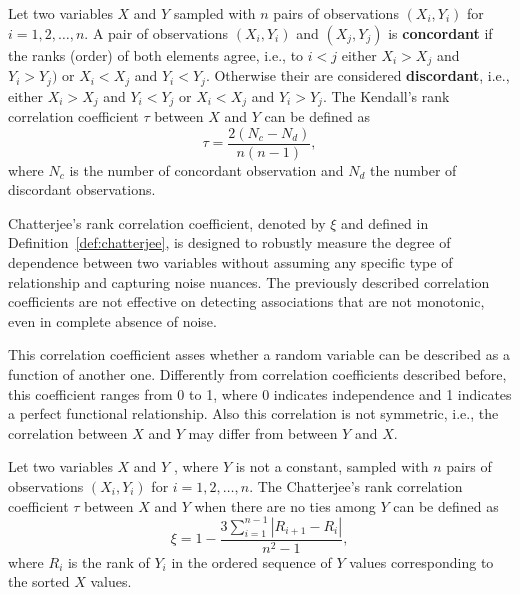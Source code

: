 \begin{definition}\label{def:kendall}
Let two variables $X$ and $Y$ sampled with $n$ pairs of observations $(X_i, Y_i)$ for $i = 1, 2, \ldots, n$. A pair of observations $(X_i, Y_i)$ and $(X_j, Y_j)$ is \textbf{concordant} if the ranks (order) of both elements agree, i.e., to $i < j$ either $X_i > X_j$ and $Y_i > Y_j)$ or $X_i < X_j$ and $Y_i < Y_j$. Otherwise their are considered \textbf{discordant}, i.e., either $X_i > X_j$ and $Y_i < Y_j$ or $X_i < X_j$ and $Y_i > Y_j$. The Kendall's rank correlation coefficient $\tau$ between $X$ and $Y$ can be defined as 
\begin{equation}\label{eq:kendall}
\tau = \frac{2(N_c - N_d)}{n(n-1)},
\end{equation}
where $N_c$ is the number of concordant observation and $N_d$ the number of discordant observations.
\end{definition}

Chatterjee's rank correlation coefficient, denoted by $\xi$ and defined in Definition~\ref{def:chatterjee}, is designed to robustly measure the degree of dependence between two variables without assuming any specific type of relationship and capturing noise nuances.  The previously described correlation coefficients are not effective on detecting associations that are not monotonic, even in complete absence of noise.

This correlation coefficient asses whether a random variable can be described as a function of another one. Differently from correlation coefficients described before, this coefficient ranges from 0 to 1, where 0 indicates independence and 1 indicates a perfect functional relationship. Also this correlation is not symmetric, i.e., the correlation between $X$ and $Y$ may differ from between $Y$ and $X$. 

\begin{definition}\label{def:chatterjee}
Let two variables $X$ and $Y$ , where $Y$ is not a constant, sampled with $n$ pairs of observations $(X_i, Y_i)$ for $i = 1, 2, \ldots, n$. The Chatterjee's rank correlation coefficient $\tau$ between $X$ and $Y$ when there are no ties among $Y$ can be defined as 
\begin{equation}\label{eq:chatterjee}
\xi = 1 - \frac{3 \sum\limits_{i=1}^{n-1} |R_{i+1} - R_i|}{n^2 - 1},
\end{equation}
where $R_i$ is the rank of $Y_i$ in the ordered sequence of $Y$ values corresponding to the sorted $X$ values. 
\end{definition}

